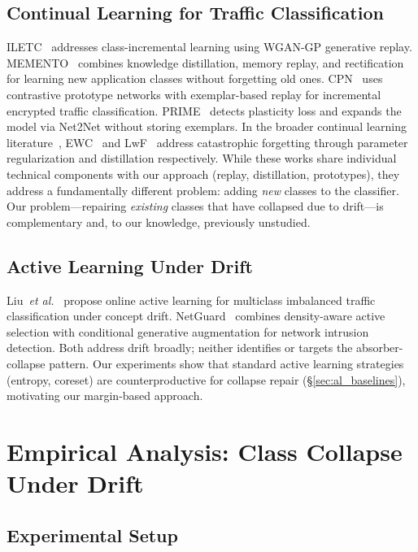\documentclass[journal]{IEEEtran}
\makeatletter
\newcommand{\etal}{\textit{et al.}\@}
\makeatother
\begin{document}
\subsection{Continual Learning for Traffic Classification}

ILETC~\cite{zhu2023iletc} addresses class-incremental learning using WGAN-GP generative replay.
MEMENTO~\cite{cerasuolo2024memento} combines knowledge distillation, memory replay, and rectification for learning new application classes without forgetting old ones.
CPN~\cite{cai2024cpn} uses contrastive prototype networks with exemplar-based replay for incremental encrypted traffic classification.
PRIME~\cite{prime2025} detects plasticity loss and expands the model via Net2Net without storing exemplars.
In the broader continual learning literature~\cite{delange2022continual}, EWC~\cite{kirkpatrick2017ewc} and LwF~\cite{li2017lwf} address catastrophic forgetting through parameter regularization and distillation respectively.
While these works share individual technical components with our approach (replay, distillation, prototypes), they address a fundamentally different problem: adding \textit{new} classes to the classifier.
Our problem---repairing \textit{existing} classes that have collapsed due to drift---is complementary and, to our knowledge, previously unstudied.

\subsection{Active Learning Under Drift}

Liu~\etal{}~\cite{micfoal2023} propose online active learning for multiclass imbalanced traffic classification under concept drift.
NetGuard~\cite{netguard2025} combines density-aware active selection with conditional generative augmentation for network intrusion detection.
Both address drift broadly; neither identifies or targets the absorber-collapse pattern.
Our experiments show that standard active learning strategies (entropy, coreset) are counterproductive for collapse repair (\S\ref{sec:al_baselines}), motivating our margin-based approach.


\section{Empirical Analysis: Class Collapse Under Drift}
\label{sec:analysis}

\subsection{Experimental Setup}
\end{document}
